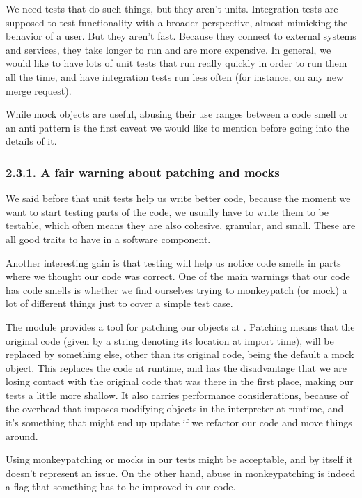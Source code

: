 \documentclass[a4paper,10pt,english]{sphinxmanual}
\begin{document}
We need tests that do such things, but they aren’t units. Integration tests are supposed to
test functionality with a broader perspective, almost mimicking the behavior of a user. But
they aren’t fast. Because they connect to external systems and services, they take longer to
run and are more expensive. In general, we would like to have lots of unit tests that run
really quickly in order to run them all the time, and have integration tests run less often (for
instance, on any new merge request).

While mock objects are useful, abusing their use ranges between a code smell or an anti\sphinxhyphen{}
pattern is the first caveat we would like to mention before going into the details of it.


\subsubsection{2.3.1. A fair warning about patching and mocks}
\label{\detokenize{chapters/8_unit_testing/index:a-fair-warning-about-patching-and-mocks}}
We said before that unit tests help us write better code, because the moment we want to
start testing parts of the code, we usually have to write them to be testable, which often
means they are also cohesive, granular, and small. These are all good traits to have in a
software component.

Another interesting gain is that testing will help us notice code smells in parts where we
thought our code was correct. One of the main warnings that our code has code smells is
whether we find ourselves trying to monkey\sphinxhyphen{}patch (or mock) a lot of different things just to
cover a simple test case.

The  module provides a tool for patching our objects at .
Patching means that the original code (given by a string denoting its location at import
time), will be replaced by something else, other than its original code, being the default a
mock object. This replaces the code at run\sphinxhyphen{}time, and has the disadvantage that we are losing
contact with the original code that was there in the first place, making our tests a little more
shallow. It also carries performance considerations, because of the overhead that imposes
modifying objects in the interpreter at run\sphinxhyphen{}time, and it’s something that might end up
update if we refactor our code and move things around.

Using monkey\sphinxhyphen{}patching or mocks in our tests might be acceptable, and by itself it doesn’t
represent an issue. On the other hand, abuse in monkey\sphinxhyphen{}patching is indeed a flag that
something has to be improved in our code.
\end{document}
